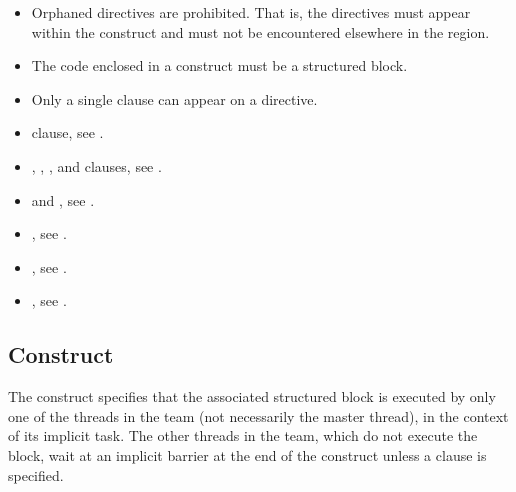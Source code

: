 \begin{itemize}
\item Orphaned  directives are prohibited. That is, the 
       directives must appear within the  
      construct and must not be encountered elsewhere in the  region.
\item The code enclosed in a  construct must be a structured block.
\item Only a single  clause can appear on a  directive.

\end{itemize}

\crossreferences
\begin{itemize}
\item {} clause, see
.

\item {}, , , and 
 clauses, see .

\item {} and , see
  .

\item {}, see .

\item {}, see
.

\item {}, see 
.

\end{itemize}



\subsection{ Construct}
\label{subsec:single Construct}
\summary
The  construct specifies that the associated structured block is 
executed by only one of the threads in the team (not necessarily the master 
thread), in the context of its implicit task. The other threads in the team, 
which do not execute the block, wait at an implicit barrier at the end of the 
 construct unless a  clause is specified.

